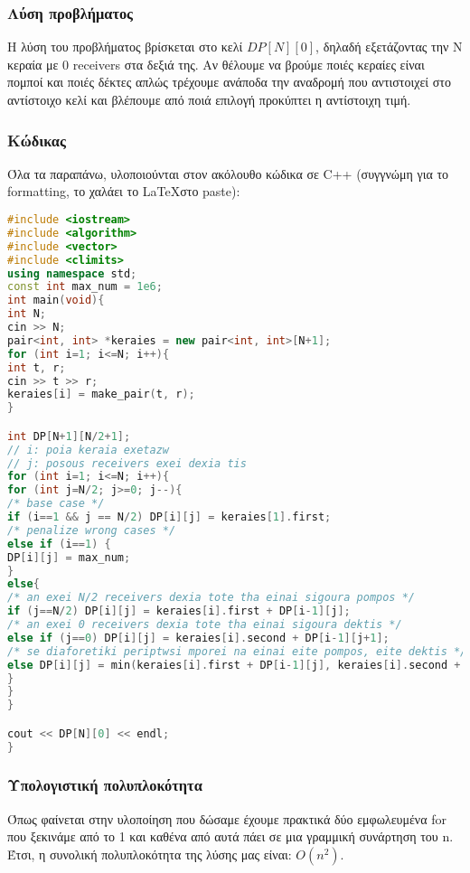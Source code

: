 \documentclass[a4paper,oneside, 11pt]{article}
\begin{document}
\subsubsection*{Λύση προβλήματος}
Η λύση του προβλήματος βρίσκεται στο κελί $DP[N][0]$, δηλαδή εξετάζοντας την N κεραία με 0 receivers στα δεξιά της. Αν θέλουμε να βρούμε ποιές κεραίες είναι πομποί και ποιές δέκτες απλώς τρέχουμε ανάποδα την αναδρομή που αντιστοιχεί στο αντίστοιχο κελί και βλέπουμε από ποιά επιλογή προκύπτει η αντίστοιχη τιμή.
\subsubsection*{Κώδικας}
Όλα τα παραπάνω, υλοποιούνται στον ακόλουθο κώδικα σε C++ (συγγνώμη για το formatting, το χαλάει το \LaTeX στο paste):
\begin{lstlisting}[language=C++]
#include <iostream>
#include <algorithm>
#include <vector>
#include <climits>
using namespace std;
const int max_num = 1e6;
int main(void){
int N;
cin >> N;
pair<int, int> *keraies = new pair<int, int>[N+1];
for (int i=1; i<=N; i++){
int t, r;
cin >> t >> r;
keraies[i] = make_pair(t, r);
}

int DP[N+1][N/2+1];
// i: poia keraia exetazw
// j: posous receivers exei dexia tis
for (int i=1; i<=N; i++){
for (int j=N/2; j>=0; j--){
/* base case */
if (i==1 && j == N/2) DP[i][j] = keraies[1].first;
/* penalize wrong cases */
else if (i==1) {
DP[i][j] = max_num;
}
else{
/* an exei N/2 receivers dexia tote tha einai sigoura pompos */
if (j==N/2) DP[i][j] = keraies[i].first + DP[i-1][j];
/* an exei 0 receivers dexia tote tha einai sigoura dektis */
else if (j==0) DP[i][j] = keraies[i].second + DP[i-1][j+1];
/* se diaforetiki periptwsi mporei na einai eite pompos, eite dektis */
else DP[i][j] = min(keraies[i].first + DP[i-1][j], keraies[i].second + DP[i-1][j+1]);
}
}
}

cout << DP[N][0] << endl;
}

\end{lstlisting}

\subsubsection*{Υπολογιστική πολυπλοκότητα}
Όπως φαίνεται στην υλοποίηση που δώσαμε έχουμε πρακτικά δύο εμφωλευμένα for που ξεκινάμε από το 1 και καθένα από αυτά πάει σε μια γραμμική συνάρτηση του n. Έτσι, η συνολική πολυπλοκότητα της λύσης μας είναι: $O(n^2)$.
\end{document}
